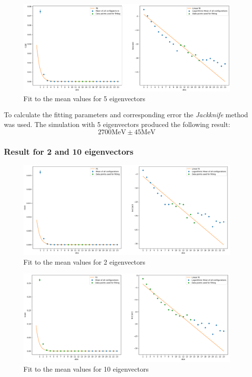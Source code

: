      \begin{figure}[H]
        \centering
        \includegraphics[width=1\textwidth]{images/5ev_fit.png} %
        \caption{Fit to the mean values for 5 eigenvectors}
        \label{5_evs_fit}
    \end{figure}
    
    To calculate the fitting parameters and corresponding error the \textit{Jackknife}\cite{jackknife} method was used. The simulation with 5 eigenvectors produced the following result:
    $$ 2700 \text{MeV} \pm 45 \text{MeV} $$
    
    \subsubsection{Result for 2 and 10 eigenvectors}
    
    \begin{figure}[H]
        \centering
        \includegraphics[width=1\textwidth]{images/2ev_fit.png} %
        \caption{Fit to the mean values for 2 eigenvectors}
        \label{2_evs_fit}
    \end{figure}
    
    \begin{figure}[H]
        \centering
        \includegraphics[width=1\textwidth]{images/10ev_fit.png} %
        \caption{Fit to the mean values for 10 eigenvectors}
        \label{10_evs_fit}
    \end{figure}
    

